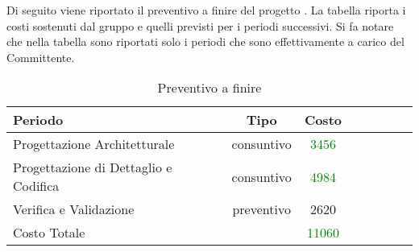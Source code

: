 Di seguito viene riportato il preventivo a finire del progetto \PROGETTO{}. La tabella riporta i costi sostenuti dal gruppo e quelli previsti per i periodi successivi. Si fa notare che nella tabella sono riportati solo i periodi che sono effettivamente a carico del Committente.

\begin{table}[h]
	\centering
	\begin{tabular}{|l|c|c|c|c|c|c|c|}
		\toprule
		\textbf{Periodo} & \textbf{Tipo} & \textbf{Costo} \\
		
		\midrule
		Progettazione Architetturale & consuntivo & \textcolor{green}{3456} \\
		Progettazione di Dettaglio e Codifica & consuntivo & \textcolor{green}{4984} \\ 
		Verifica e Validazione & preventivo & 2620 \\
		
		\midrule
		Costo Totale & & \textcolor{green}{11060} \\
				
		\bottomrule
	\end{tabular}
	\caption{Preventivo a finire}
\end{table}
